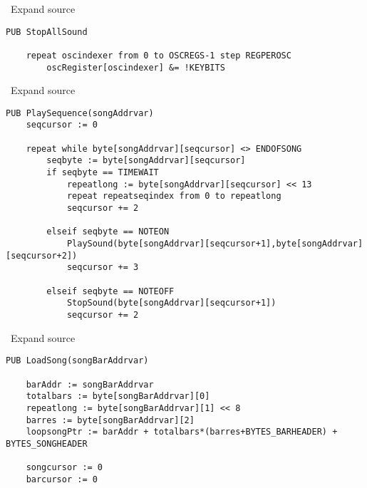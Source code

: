 \textbf{} ~Expand source

\lstset{style=spin}
\begin{lstlisting}
PUB StopAllSound

    repeat oscindexer from 0 to OSCREGS-1 step REGPEROSC
        oscRegister[oscindexer] &= !KEYBITS 
\end{lstlisting}


\textbf{} ~Expand source

\lstset{style=spin}
\begin{lstlisting}
PUB PlaySequence(songAddrvar)
    seqcursor := 0
    
    repeat while byte[songAddrvar][seqcursor] <> ENDOFSONG
        seqbyte := byte[songAddrvar][seqcursor]
        if seqbyte == TIMEWAIT
            repeatlong := byte[songAddrvar][seqcursor] << 13
            repeat repeatseqindex from 0 to repeatlong
            seqcursor += 2
        
        elseif seqbyte == NOTEON
            PlaySound(byte[songAddrvar][seqcursor+1],byte[songAddrvar][seqcursor+2])   
            seqcursor += 3
        
        elseif seqbyte == NOTEOFF
            StopSound(byte[songAddrvar][seqcursor+1])
            seqcursor += 2
\end{lstlisting}


\textbf{} ~Expand source

\lstset{style=spin}
\begin{lstlisting}
PUB LoadSong(songBarAddrvar)

    barAddr := songBarAddrvar
    totalbars := byte[songBarAddrvar][0]
    repeatlong := byte[songBarAddrvar][1] << 8
    barres := byte[songBarAddrvar][2]
    loopsongPtr := barAddr + totalbars*(barres+BYTES_BARHEADER) + BYTES_SONGHEADER        
    
    songcursor := 0
    barcursor := 0
\end{lstlisting}

